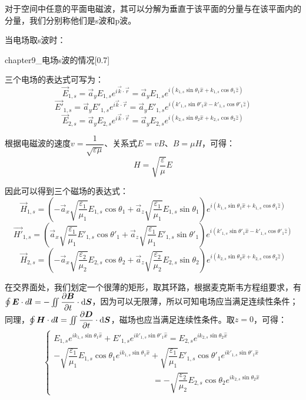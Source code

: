 \begin{prove}
  对于空间中任意的平面电磁波，其可以分解为垂直于该平面的分量与在该平面内的分量，我们分别称他们是s波和p波。
  
  当电场取s波时：
  \begin{singlefigure}[电场s波的情况]{chapter9_电场s波的情况}[0.7]
  \end{singlefigure}

  三个电场的表达式可写为：
  \[\vec{E}_{1,s} = \vec{a}_y E_{1,s} e^{i\vec{k}\cdot\vec{r}} = \vec{a}_y E_{1,s} e^{i(k_{1,s}\sin\theta_1 \hat{x} + k_{1,s}\cos\theta_1 \hat{z})}\]
  \[\vec{E'}_{1,s} = \vec{a}_y E'_{1,s} e^{i\vec{k}\cdot\vec{r}} = \vec{a}_y E'_{1,s} e^{i(k'_{1,s}\sin\theta'_1 \hat{x} - k'_{1,s}\cos\theta'_1 \hat{z})}\]
  \[\vec{E}_{2,s} = \vec{a}_y E_{2,s} e^{i\vec{k}\cdot\vec{r}} = \vec{a}_y E_{2,s} e^{i(k_{2,s}\sin\theta_2 \hat{x} + k_{2,s}\cos\theta_2 \hat{z})}\]
  
  根据电磁波的速度$v = \dfrac{1}{\sqrt{\varepsilon\mu}}$、关系式$E = vB$、$B = \mu H$，可得：
  \[H = \sqrt{\dfrac{\varepsilon}{\mu}}E\]

  因此可以得到三个磁场的表达式：
  \[\vec{H}_{1,s} = (-\vec{a}_x\sqrt{\dfrac{\varepsilon_1}{\mu_1}}E_{1,s}\cos\theta_1 + \vec{a}_z\sqrt{\dfrac{\varepsilon_1}{\mu_1}}E_{1,s}\sin\theta_1) e^{i(k_{1,s}\sin\theta_1 \hat{x} + k_{1,s}\cos\theta_1 \hat{z})}\]
  \[\vec{H'}_{1,s} = (\vec{a}_x\sqrt{\dfrac{\varepsilon_1}{\mu_1}}E'_{1,s}\cos\theta'_1 + \vec{a}_z\sqrt{\dfrac{\varepsilon_1}{\mu_1}}E'_{1,s}\sin\theta'_1) e^{i(k'_{1,s}\sin\theta'_1 \hat{x} - k'_{1,s}\cos\theta'_1 \hat{z})}\]
  \[\vec{H}_{2,s} = (-\vec{a}_x\sqrt{\dfrac{\varepsilon_2}{\mu_2}}E_{2,s}\cos\theta_2 + \vec{a}_z\sqrt{\dfrac{\varepsilon_2}{\mu_2}}E_{2,s}\sin\theta_2) e^{i(k_{2,s}\sin\theta_2 \hat{x} + k_{2,s}\cos\theta_2 \hat{z})}\]

  在交界面处，我们划定一个很薄的矩形，取其环路，根据麦克斯韦方程组要求，有$\oint \vec{E}\cdot d\vec{l} = -\iint\dfrac{\partial \vec{B}}{\partial t}\cdot\dif{\vec{S}}$，因为可以无限薄，所以可知电场应当满足连续性条件；同理，$\oint \vec{H}\cdot d\vec{l} = \iint\dfrac{\partial \vec{D}}{\partial t}\cdot\dif{\vec{S}}$，磁场也应当满足连续性条件。取$z = 0$，可得：
  \begin{align*}
    \begin{cases}
      E_{1,s} e^{ik_{1,s}\sin\theta_1\hat{x}} + E'_{1,s} e^{ik'_{1,s}\sin\theta'_1\hat{x}} = E_{2,s} e^{ik_{2,s}\sin\theta_2\hat{x}}\\
      -\sqrt{\dfrac{\varepsilon_1}{\mu_1}}E_{1,s}\cos\theta_1 e^{ik_{1,s}\sin\theta_1\hat{x}} + \sqrt{\dfrac{\varepsilon_1}{\mu_1}}E'_{1,s}\cos\theta'_1 e^{ik'_{1,s}\sin\theta'_1\hat{x}}\\
      \hspace{12em} = -\sqrt{\dfrac{\varepsilon_2}{\mu_2}}E_{2,s}\cos\theta_2 e^{ik_{2,s}\sin\theta_2\hat{x}}
    \end{cases}
  \end{align*}


\end{prove}
